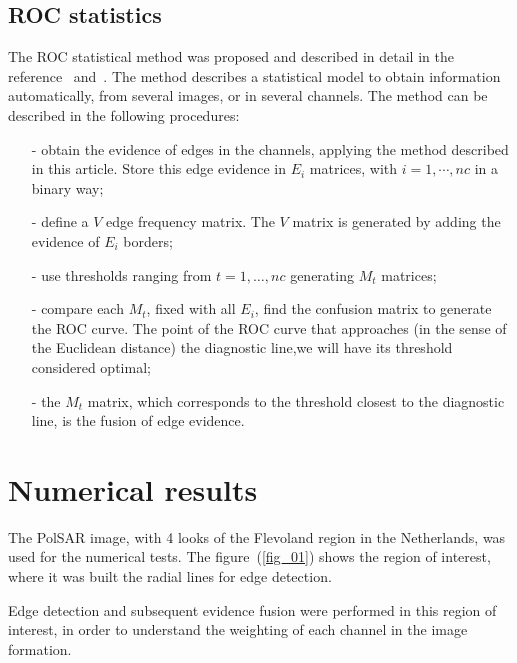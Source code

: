 \documentclass[conference]{IEEEtran}
\begin{document}
\subsection{ROC statistics}
The ROC statistical method was proposed and described in detail in the reference~\cite{gs} and~\cite{fawcett}. The method describes a statistical model to obtain information automatically, from several images, or in several channels. The method can be described in the following procedures:
\begin{itemize}
\item[-] obtain the evidence of edges in the channels, applying the method described in this article. Store this edge evidence in $E_i$ matrices, with $i=1,\cdots,nc$ in a binary way;
\item[-] define a $V$ edge frequency matrix. The $V$ matrix is generated by adding the evidence of $E_i$ borders;
\item[-] use thresholds ranging from $t=1,\dots,nc$ generating $M_t$ matrices;
\item[-] compare each $M_t$, fixed with all $E_i$, find the confusion matrix to generate the ROC curve. The point of the ROC curve that approaches (in the sense of the Euclidean distance) the diagnostic line,we will have its threshold considered optimal;
\item[-] the $M_t$ matrix, which corresponds to the threshold closest to the diagnostic line, is the fusion of edge evidence.
\end{itemize}

\section{Numerical results}\label{sec_07}
The PolSAR image, with 4 looks of the Flevoland region in the Netherlands, was used for the numerical tests. The figure~(\ref{fig_01}) shows the region of interest, where it was built the radial lines for edge detection.

 Edge detection and subsequent evidence fusion were performed in this region of interest, in order to understand the weighting of each channel in the image formation.
\end{document}
